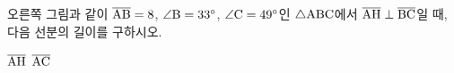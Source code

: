 \noindent\begin{minipage}[t]{0.58\linewidth}\vspace{0pt}\raggedright 오른쪽 그림과 같이 $\overline{\mathrm{AB}}=8$, $\angle\mathrm{B}=33^\circ$, $\angle\mathrm{C}=49^\circ$인 $\triangle\mathrm{ABC}$에서 $\overline{\mathrm{AH}}\perp\overline{\mathrm{BC}}$일 때, 다음 선분의 길이를 구하시오. \end{minipage}\hfill\begin{minipage}[t]{0.4\linewidth}\vspace{0pt}\centering \resizebox{\ifdim\width>\linewidth\linewidth\else\width\fi}{!}{}\end{minipage}\par
{} $\overline{\mathrm{AH}}$
 $\overline{\mathrm{AC}}$
